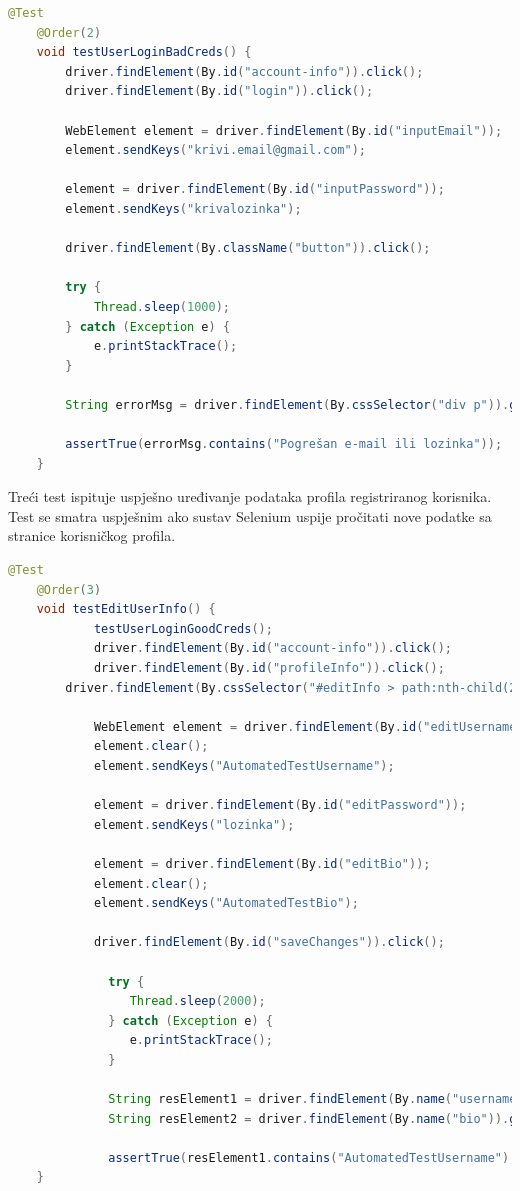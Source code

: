    \begin{lstlisting}[language=Java,breaklines=true]
    @Test
	@Order(2)
	void testUserLoginBadCreds() {
		driver.findElement(By.id("account-info")).click();
		driver.findElement(By.id("login")).click();

		WebElement element = driver.findElement(By.id("inputEmail"));
		element.sendKeys("krivi.email@gmail.com");

		element = driver.findElement(By.id("inputPassword"));
		element.sendKeys("krivalozinka");

		driver.findElement(By.className("button")).click();

		try {
			Thread.sleep(1000);
		} catch (Exception e) {
			e.printStackTrace();
		}

		String errorMsg = driver.findElement(By.cssSelector("div p")).getAttribute("innerHTML");

		assertTrue(errorMsg.contains("Pogrešan e-mail ili lozinka"));
	}
    \end{lstlisting}
    
    Treći test ispituje uspješno uređivanje podataka profila registriranog korisnika. Test se smatra uspješnim ako sustav Selenium uspije pročitati nove podatke sa stranice korisničkog profila.

    \begin{lstlisting}[language=Java,breaklines=true]
    @Test
    @Order(3)
    void testEditUserInfo() {
    		testUserLoginGoodCreds();
    		driver.findElement(By.id("account-info")).click();
    		driver.findElement(By.id("profileInfo")).click();
		driver.findElement(By.cssSelector("#editInfo > path:nth-child(2)")).click();

    		WebElement element = driver.findElement(By.id("editUsername"));
    		element.clear();
    		element.sendKeys("AutomatedTestUsername");
    
    		element = driver.findElement(By.id("editPassword"));
    		element.sendKeys("lozinka");

    		element = driver.findElement(By.id("editBio"));
    		element.clear();
    		element.sendKeys("AutomatedTestBio");
    
    		driver.findElement(By.id("saveChanges")).click();

		      try {
			     Thread.sleep(2000);
		      } catch (Exception e) {
			     e.printStackTrace();
		      }

		      String resElement1 = driver.findElement(By.name("username")).getAttribute("innerHTML");
		      String resElement2 = driver.findElement(By.name("bio")).getAttribute("innerHTML");

		      assertTrue(resElement1.contains("AutomatedTestUsername") && resElement2.contains("AutomatedTestBio"));
    }
    \end{lstlisting}
    
